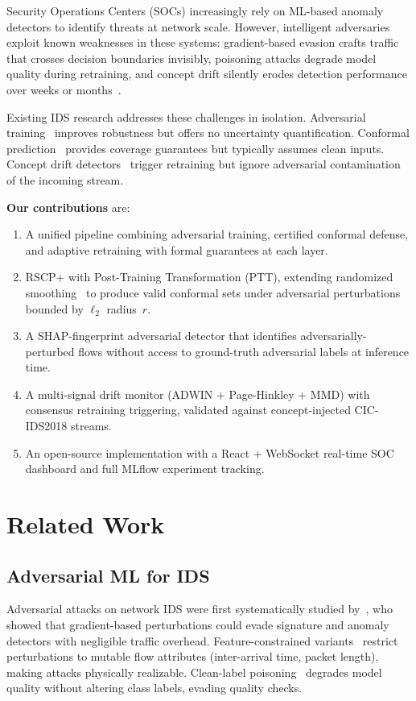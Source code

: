 \documentclass[conference]{IEEEtran}
\begin{document}
Security Operations Centers (SOCs) increasingly rely on ML-based anomaly
detectors to identify threats at network scale. However, intelligent adversaries
exploit known weaknesses in these systems: gradient-based evasion crafts
traffic that crosses decision boundaries invisibly, poisoning attacks degrade
model quality during retraining, and concept drift silently erodes detection
performance over weeks or months~\cite{ring2019survey}.

Existing IDS research addresses these challenges in isolation. Adversarial
training~\cite{madry2018towards} improves robustness but offers no uncertainty
quantification. Conformal prediction~\cite{vovk2005algorithmic} provides
coverage guarantees but typically assumes clean inputs. Concept drift
detectors~\cite{bifet2007learning} trigger retraining but ignore adversarial
contamination of the incoming stream.

\textbf{Our contributions} are:
\begin{enumerate}
  \item A unified pipeline combining adversarial training, certified conformal
        defense, and adaptive retraining with formal guarantees at each layer.
  \item RSCP+ with Post-Training Transformation (PTT), extending randomized
        smoothing~\cite{cohen2019certified} to produce valid conformal sets
        under adversarial perturbations bounded by $\ell_2$ radius~$r$.
  \item A SHAP-fingerprint adversarial detector that identifies
        adversarially-perturbed flows without access to ground-truth adversarial
        labels at inference time.
  \item A multi-signal drift monitor (ADWIN + Page-Hinkley + MMD) with
        consensus retraining triggering, validated against concept-injected
        CIC-IDS2018 streams.
  \item An open-source implementation with a React + WebSocket real-time
        SOC dashboard and full MLflow experiment tracking.
\end{enumerate}

\section{Related Work}
\label{sec:related}

\subsection{Adversarial ML for IDS}
Adversarial attacks on network IDS were first systematically studied
by~\cite{carlini2017towards}, who showed that gradient-based perturbations
could evade signature and anomaly detectors with negligible traffic overhead.
Feature-constrained variants~\cite{brendel2018decision} restrict perturbations
to mutable flow attributes (inter-arrival time, packet length), making attacks
physically realizable. Clean-label poisoning~\cite{shafahi2018poison} degrades
model quality without altering class labels, evading quality checks.
\end{document}
